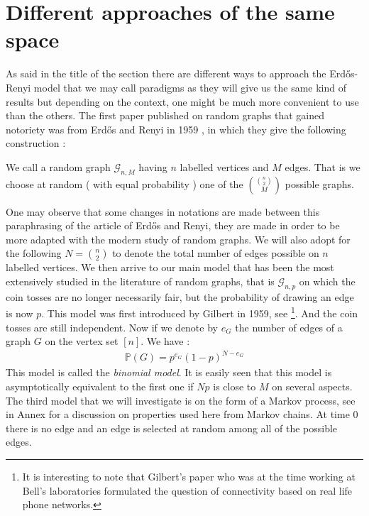\section{Different approaches of the same space}
As said in the title of the section there are different ways to approach the Erd\H{o}s-Renyi model that we may call paradigms as they will give us the same kind of results but depending on the context, one might be much more convenient to use than the others.
\newline
The first paper published on random graphs that gained notoriety was from Erd\H{o}s and Renyi in 1959 \cite{erdos59}, in which they give the following construction :
\begin{definition}
We call a random graph $\mathcal{G}_{n, M}$ having $n$ labelled vertices and $M$ edges. That is we choose at random ( with equal probability ) one of the $\binom{\binom{n}{2}}{M}$ possible graphs.
\end{definition}
One may observe that some changes in notations are made between this paraphrasing of the article of Erd\H{o}s and Renyi, they are made in order to be more adapted with the modern study of random graphs. We will also adopt for the following $N = \binom{n}{2}$ to denote the total number of edges possible on $n$ labelled vertices.
\newline
We then arrive to our main model that has been the most extensively studied in the literature of random graphs, that is $\mathcal{G}_{n, p}$ on which the coin tosses are no longer necessarily fair, but the probability of drawing an edge is now $p$.
This model was first introduced by Gilbert in 1959, see \cite{Gilbert59}\footnote{It is interesting to note that Gilbert's paper who was at the time working at Bell's laboratories formulated the question of connectivity based on real life phone networks.}.
And the coin tosses are still independent. Now if we denote by $e_G$ the number of edges of a graph $G$ on the vertex set $[n]$. We have :
\begin{align}
	\mathbb{P}(G) = p^{e_G}(1-p)^{N-e_G}
\end{align}
This model is called the \emph{binomial model}. It is easily seen that this model is asymptotically equivalent to the first one if $Np$ is close to $M$ on several aspects.
\newline
The third model that we will investigate is on the form of a Markov process, see in Annex for a discussion on properties used here from Markov chains. 
At time 0 there is no edge and an edge is selected at random among all of the possible edges. 
